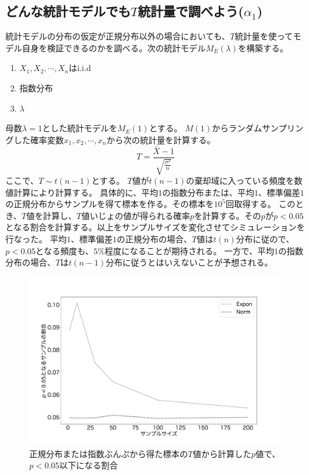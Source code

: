 \subsection{どんな統計モデルでも$T$統計量で調べよう($\alpha_1$)}
統計モデルの分布の仮定が正規分布以外の場合においても、$T$統計量を使ってモデル自身を検証できるのかを調べる。次の統計モデル$M_E(\lambda)$を構築する。
\begin{enumerate}
    \item $X_1,X_2,\cdots,X_n $はi.i.d
    \item 指数分布
    \item $\lambda$
\end{enumerate}
母数$\lambda=1$とした統計モデルを$M_E(1)$とする。
$M(1)$からランダムサンプリングした確率変数$x_1,x_2,\cdots,x_n$から次の統計量を計算する。
\begin{equation*}
    T = \frac{\bar{X}-1}{\sqrt{\frac{\sigma^2}{n}}}
\end{equation*}
ここで、$T \sim t(n-1)$とする。
$T$値が$t(n-1)$の棄却域に入っている頻度を数値計算により計算する。
具体的に、平均$1$の指数分布または、平均$1$、標準偏差$1$の正規分布からサンプルを得て標本を作る。その標本を$10^5$回取得する。
このとき、$T$値を計算し、$T$値いじょの値が得られる確率$p$を計算する。その$p$が$p<0.05$となる割合を計算する。以上をサンプルサイズを変化させてシミュレーションを行なった。
平均$1$、標準偏差$1$の正規分布の場合、$T$値は$t(n)$分布に従ので、$p<0.05$となる頻度も、$5\%$程度になることが期待される。
一方で、平均$1$の指数分布の場合、$T$は$t(n-1)$分布に従うとはいえないことが予想される。%


\begin{figure}
    \begin{center}
        \includegraphics[width=15cm]{./image/04_/t_test_expon_norm.pdf}
        \caption{正規分布または指数ぶんぷから得た標本の$T$値から計算した$p$値で、$p<0.05$以下になる割合}
    \end{center}
\end{figure}

